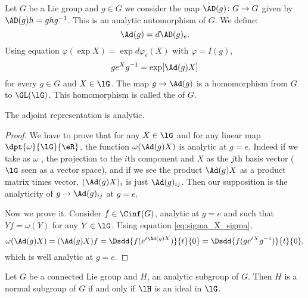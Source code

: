 Let $G$ be a Lie group and $g\in G$ we consider the map $\AD(g)\colon G\to G$ given by $\AD(g)h=g hg^{-1}$. This is an analytic automorphism of $G$. We define:
\[
	\Ad(g)=d\AD(g)_e.
\]
Using equation $\varphi(\exp X)=\exp d\varphi_e(X)$ with $\varphi=I(g)$,
\begin{equation}\label{eq:sigma_X_sigma}
	g e^{X}g^{-1}=\exp[ \Ad(g)X ]
\end{equation}
for every $g\in G$ and $X\in\lG$. The map $g\to\Ad(g)$ is a homomorphism from $G$ to $\GL(\lG)$. This homomorphism is called the  of $G$.

\begin{proposition}
	The adjoint representation is analytic.
\end{proposition}

\begin{proof}
	We have to prove that for any $X\in\lG$ and for any linear map $\dpt{\omega}{\lG}{\eR}$, the function $\omega(\Ad(g)X)$ is analytic at $g=e$. Indeed if we take as $\omega$ , the projection to the $i$th component and $X$ as the $j$th basis vector ($\lG$ seen as a vector space), and if we see the product $\Ad(g)X$ as a product matrix times vector, $(\Ad(g)X)_i$ is just $\Ad(g)_{ij}$. Then our supposition is the analyticity of $g\to\Ad(g)_{ij}$ at $g=e$. 

	Now we prove it. Consider $f\in\Cinf(G)$, analytic at $g=e$ and such that $Yf=\omega(Y)$ for any $Y\in\lG$. Using equation \eqref{eq:sigma_X_sigma},
	\begin{equation}
		\omega(\Ad(g)X)=(\Ad(g)X)f
		=\Dsdd{ f(e^{t\Ad(g)X}) }{t}{0}
		=\Dsdd{ f(g e^{tX}g^{-1}) }{t}{0},
	\end{equation}
	which is well analytic at $g=e$.
\end{proof}


\begin{proposition}
	Let $G$ be a connected Lie group and $H$, an analytic subgroup of $G$. Then $H$ is a normal subgroup of $G$ if and only if $\lH$ is an ideal in $\lG$.
\end{proposition}

